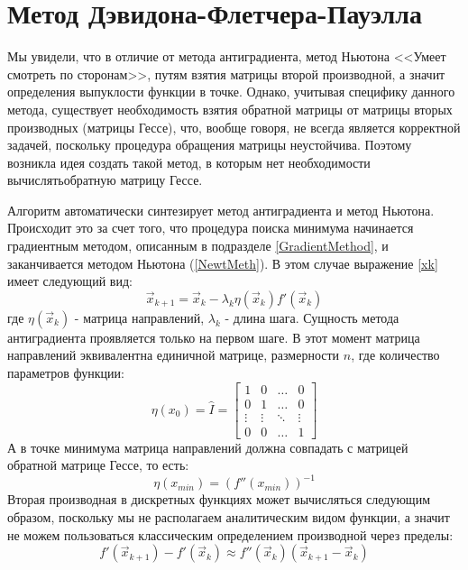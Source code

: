 \section{Метод Дэвидона-Флетчера-Пауэлла}
Мы увидели, что в отличие от метода антиградиента, метод Ньютона <<Умеет смотреть по сторонам>>, путям взятия матрицы второй производной, а значит определения выпуклости функции в точке. Однако, учитывая специфику данного метода, существует необходимость взятия обратной матрицы от матрицы вторых производных (матрицы Гессе), что, вообще говоря, не всегда является корректной задачей, поскольку процедура обращения матрицы неустойчива. Поэтому возникла идея создать такой метод, в которым нет необходимости вычислятьобратную матрицу Гессе.

Алгоритм автоматически синтезирует метод антиградиента и метод Ньютона. Происходит это за счет того, что процедура поиска минимума начинается градиентным методом, описанным в подразделе \ref{GradientMethod}, и заканчивается методом Ньютона (\ref{NewtMeth}).
В этом случае выражение \ref{xk} имеет следующий вид:
\begin{equation}
    \vec x_{k+1} = \vec x_k - \lambda_k \eta(\vec x_k)f'(\vec x_k)
\end{equation}
где $\eta(\vec x_k)$ - матрица направлений, $\lambda_k$ - длина шага.
Сущность метода антиградиента проявляется только на первом шаге. В этот момент матрица направлений эквивалентна единичной матрице, размерности $n$, где количество параметров функции:
\begin{equation*}
    \eta (x_0) = \hat I = \left[\begin{array}{cccc}
        1 & 0 & \ldots & 0 \\
        0 & 1 & \ldots & 0 \\
        \vdots & \vdots & \ddots & \vdots\\
        0 & 0 & \ldots & 1
    \end{array}\right]
\end{equation*}
А в точке минимума матрица направлений должна совпадать с матрицей обратной матрице Гессе, то есть:
\begin{equation*}
    \eta(x_{min}) = \left(f''(x_{min})\right)^{-1}
\end{equation*}
Вторая производная в дискретных функциях может вычисляться следующим образом, поскольку мы не располагаем аналитическим видом функции, а значит не можем пользоваться классическим определением производной через пределы:
\begin{equation}
    f'(\vec x_{k+1})-f'(\vec x_k) \approx f''(\vec x_k)(\vec x_{k+1}-\vec x_k)
    \label{deriv}
\end{equation}
